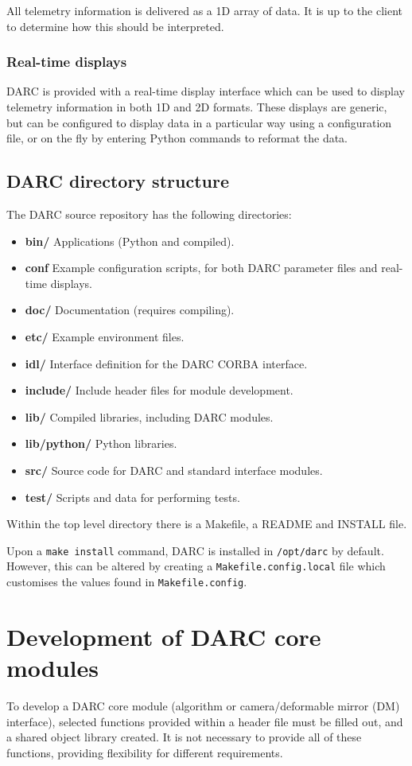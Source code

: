 \documentclass[a4,10pt]{article}
\newcommand{\dm}{deformable mirror (DM)\renewcommand{\dm}{DM\xspace}\xspace}
\begin{document}
All telemetry information is delivered as a 1D array of data.  It is
up to the client to determine how this should be interpreted.

\subsubsection{Real-time displays}
DARC is provided with a real-time display interface which can be used
to display telemetry information in both 1D and 2D formats.  These
displays are generic, but can be configured to display data in a
particular way using a configuration file, or on the fly by entering
Python commands to reformat the data.

\subsection{DARC directory structure}
The DARC source repository has the following directories:
\begin{itemize}
\item {\bf bin/}  Applications (Python and compiled).
\item {\bf conf}  Example configuration scripts, for both DARC
  parameter files and real-time displays.
\item {\bf doc/}  Documentation (requires compiling).
\item {\bf etc/}  Example environment files.
\item {\bf idl/}  Interface definition for the DARC CORBA interface.
\item {\bf include/}  Include header files for module development.
\item {\bf lib/}  Compiled libraries, including DARC modules.
\item {\bf lib/python/} Python libraries.
\item {\bf src/}  Source code for DARC and standard interface modules.
\item {\bf test/} Scripts and data for performing tests.
\end{itemize}

Within the top level directory there is a Makefile, a README and
INSTALL file.

Upon a {\tt make install} command, DARC is installed in {\tt /opt/darc} by
default.  However, this can be altered by creating a
{\tt Makefile.config.local} file which customises the values found in
{\tt Makefile.config}.


\section{Development of DARC core modules}
To develop a DARC core module (algorithm or camera/\dm interface),
selected functions provided within a header file must be filled out,
and a shared object library created.  It is not necessary to provide
all of these functions, providing flexibility for different requirements.
\end{document}
